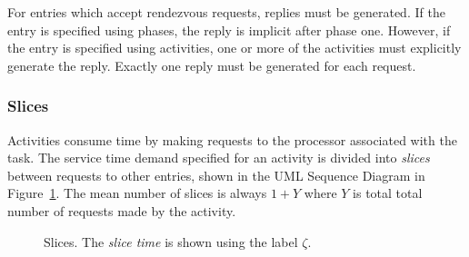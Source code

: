 For entries which accept rendezvous requests,
replies must be generated.  If the entry is specified using phases,
the reply is implicit after phase
one.  However, if the entry is specified using
activities, one or more of the activities must
explicitly generate the reply.  Exactly one
reply must be generated for each request.

\subsubsection{Slices}
\label{sec:slices}

Activities consume time by making requests to the processor associated with the task.  The service time
demand specified for an activity is divided into {\em slices} between requests to other entries, shown in
the UML Sequence Diagram in Figure~\ref{fig:slices}. The mean number of slices is always $1 + Y$ where $Y$
is total total number of requests made by the activity.  

\begin{figure}[htbp]
  \centering
  \caption{Slices\protect{}.  The \emph{slice time} is shown using the label $\zeta$.}
  \label{fig:slices}
\end{figure}

